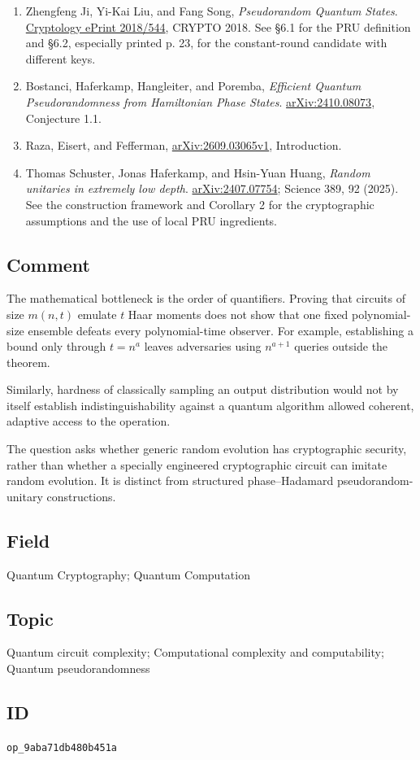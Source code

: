 \begin{enumerate}[label={},leftmargin=4.8em,labelsep=0.5em]
  \footnotesize
  \item[\textup{[Ji18]}]\label{ref:9aba-ji18}
  Zhengfeng Ji, Yi-Kai Liu, and Fang Song, \emph{Pseudorandom Quantum States}. \href{https://eprint.iacr.org/2018/544.pdf}{Cryptology ePrint 2018/544}, CRYPTO 2018. See §6.1 for the PRU definition and §6.2, especially printed p. 23, for the constant-round candidate with different keys.

  \item[\textup{[Bostanci25]}]\label{ref:9aba-bostanci25}
  Bostanci, Haferkamp, Hangleiter, and Poremba, \emph{Efficient Quantum Pseudorandomness from Hamiltonian Phase States}. \href{https://arxiv.org/html/2410.08073}{arXiv:2410.08073}, Conjecture 1.1.

  \item[\textup{[Raza26]}]\label{ref:9aba-raza26}
  Raza, Eisert, and Fefferman, \href{https://arxiv.org/html/2609.03065v1}{arXiv:2609.03065v1}, Introduction.

  \item[\textup{[Schuster25]}]\label{ref:9aba-schuster25}
  Thomas Schuster, Jonas Haferkamp, and Hsin-Yuan Huang, \emph{Random unitaries in extremely low depth}. \href{https://arxiv.org/html/2407.07754}{arXiv:2407.07754}; Science 389, 92 (2025). See the construction framework and Corollary 2 for the cryptographic assumptions and the use of local PRU ingredients.
\end{enumerate}

\subsection*{Comment}

The mathematical bottleneck is the order of quantifiers. Proving that circuits of size $m(n,t)$ emulate $t$ Haar moments does not show that one fixed polynomial-size ensemble defeats every polynomial-time observer. For example, establishing a bound only through $t=n^a$ leaves adversaries using $n^{a+1}$ queries outside the theorem.

Similarly, hardness of classically sampling an output distribution would not by itself establish indistinguishability against a quantum algorithm allowed coherent, adaptive access to the operation.

The question asks whether generic random evolution has cryptographic security, rather than whether a specially engineered cryptographic circuit can imitate random evolution. It is distinct from structured phase--Hadamard pseudorandom-unitary constructions.

\subsection*{Field}

Quantum Cryptography; Quantum Computation

\subsection*{Topic}

Quantum circuit complexity; Computational complexity and computability; Quantum pseudorandomness

\subsection*{ID}

\texttt{op\_9aba71db480b451a}
